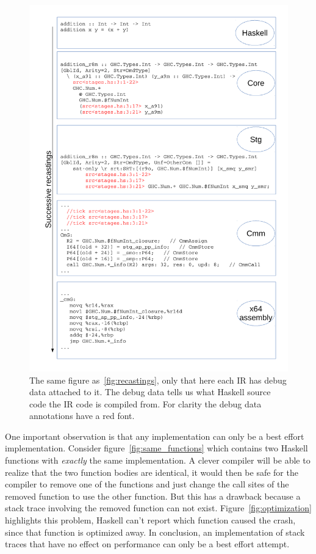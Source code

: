 \begin{figure}
\begin{mdframed}
  \centering
  \includegraphics[width=5.4in]{fig/recastings_ticks}
  \caption{The same figure as~\ref{fig:recastings}, only that here each
  IR has debug data attached to it. The debug data tells us what Haskell
  source code the IR code is compiled from. For clarity the debug data
  annotations have a red font.}
  \label{fig:recastings_ticks}
\end{mdframed}
\end{figure}

One important observation is that
any implementation can only be a best effort implementation.
Consider figure~\ref{fig:same_functions} which contains two Haskell functions
with \emph{exactly} the same implementation. A clever compiler will
be able to realize that the two function bodies are identical,
it would then be safe for the compiler to remove one of the functions
and just change the call sites of the removed function to use the other function.
But this has a drawback because a stack trace
involving the removed function can not exist. Figure~\ref{fig:optimization} highlights this problem, Haskell can't
report which function caused the crash, since that
function is optimized away. In conclusion, an implementation of stack traces that have no
effect on performance can only be a best effort attempt.

